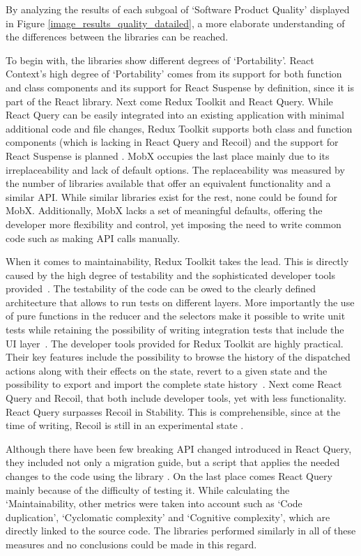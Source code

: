 By analyzing the results of each subgoal of `Software Product Quality'
displayed in Figure \ref{image_results_quality_datailed}, a more elaborate understanding of the
differences between the libraries can be reached.

To begin with, the libraries show different degrees of `Portability'.
React Context's high degree of `Portability' comes from its support for
both function and class components and its support for React Suspense by definition, since it is part of the React library. Next come Redux Toolkit and React Query. While
React Query can be easily integrated into an existing application with
minimal additional code and file changes, Redux Toolkit supports both
class and function components (which is lacking in React Query and
Recoil) and the support for React Suspense is planned \cite{redux_toolkit_suspense_planned_support}. MobX
occupies the last place mainly due to its irreplaceability and lack of
default options. The replaceability was measured by the number of
libraries available that offer an equivalent functionality and a similar
API. While similar libraries exist for the rest, none could be found for
MobX. Additionally, MobX lacks a set of meaningful defaults, offering
the developer more flexibility and control, yet imposing the need to
write common code such as making API calls manually.

When it comes to maintainability, Redux Toolkit takes the lead. This is
directly caused by the high degree of testability and the sophisticated
developer tools provided~\cite{redux_dev_tools}. The testability of the code can be owed
to the clearly defined architecture that allows to run tests on
different layers. More importantly the use of pure functions in the
reducer and the selectors make it possible to write unit tests while
retaining the possibility of writing integration tests that include the
UI layer~\cite{redux_testing}. The developer tools provided for Redux Toolkit are
highly practical. Their key features include the possibility to browse
the history of the dispatched actions along with their effects on the
state, revert to a given state and the possibility to export and import
the complete state history~\cite{redux_dev_tools}. Next come React Query and Recoil, that both
include developer tools, yet with less functionality. React Query
surpasses Recoil in Stability. This is comprehensible, since at the time
of writing, Recoil is still in an experimental state \cite{recoil_github_experimental}.

Although there have been few breaking API changed introduced in React
Query, they included not only a migration guide, but a script that
applies the needed changes to the code using the library \cite{react_toolkit_upgrade_with_codemod}. On the
last place comes React Query mainly because of the difficulty of testing
it. While calculating the `Maintainability, other metrics were taken
into account such as `Code duplication', `Cyclomatic complexity' and
`Cognitive complexity', which are directly linked to the source code.
The libraries performed similarly in all of these measures and no
conclusions could be made in this regard.

